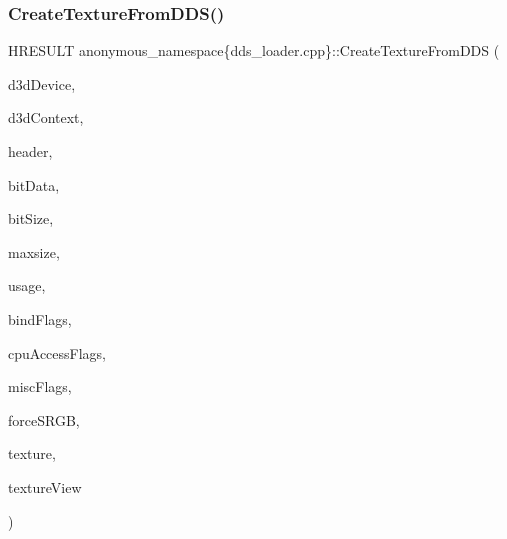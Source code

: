 \subsubsection{\texorpdfstring{Create\+Texture\+From\+D\+D\+S()}{CreateTextureFromDDS()}}
{\footnotesize\ttfamily H\+R\+E\+S\+U\+LT anonymous\+\_\+namespace\{dds\+\_\+loader.\+cpp\}\+::Create\+Texture\+From\+D\+DS (\begin{DoxyParamCaption}\item[{\+\_\+\+In\+\_\+ I\+D3\+D11\+Device $\ast$}]{d3d\+Device,  }\item[{\+\_\+\+In\+\_\+opt\+\_\+ I\+D3\+D11\+Device\+Context $\ast$}]{d3d\+Context,  }\item[{\+\_\+\+In\+\_\+ const \mbox{\hyperlink{struct_d_d_s___h_e_a_d_e_r}{D\+D\+S\+\_\+\+H\+E\+A\+D\+ER}} $\ast$}]{header,  }\item[{\+\_\+\+In\+\_\+reads\+\_\+bytes\+\_\+(bit\+Size) const uint8\+\_\+t $\ast$}]{bit\+Data,  }\item[{\+\_\+\+In\+\_\+ size\+\_\+t}]{bit\+Size,  }\item[{\+\_\+\+In\+\_\+ size\+\_\+t}]{maxsize,  }\item[{\+\_\+\+In\+\_\+ D3\+D11\+\_\+\+U\+S\+A\+GE}]{usage,  }\item[{\+\_\+\+In\+\_\+ unsigned int}]{bind\+Flags,  }\item[{\+\_\+\+In\+\_\+ unsigned int}]{cpu\+Access\+Flags,  }\item[{\+\_\+\+In\+\_\+ unsigned int}]{misc\+Flags,  }\item[{\+\_\+\+In\+\_\+ bool}]{force\+S\+R\+GB,  }\item[{\+\_\+\+Outptr\+\_\+opt\+\_\+ I\+D3\+D11\+Resource $\ast$$\ast$}]{texture,  }\item[{\+\_\+\+Outptr\+\_\+opt\+\_\+ I\+D3\+D11\+Shader\+Resource\+View $\ast$$\ast$}]{texture\+View }\end{DoxyParamCaption})}

\mbox{\label{namespaceanonymous__namespace_02dds__loader_8cpp_03_a1e6625f0f160c3b83ad3b703589fc33d}} 
